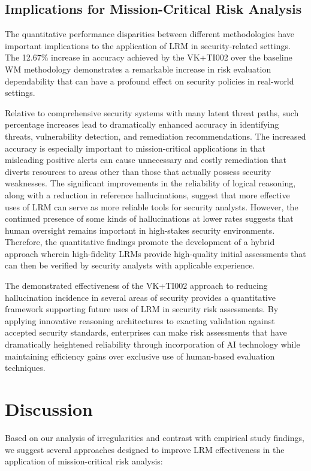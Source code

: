 \documentclass[sigconf]{acmart}
\begin{document}
\subsection{Implications for Mission-Critical Risk Analysis}
The quantitative performance disparities between different methodologies have important implications to the application of LRM in security-related settings. The 12.67\% increase in accuracy achieved by the VK+TI002 over the baseline WM methodology demonstrates a remarkable increase in risk evaluation dependability that can have a profound effect on security policies in real-world settings.

Relative to comprehensive security systems with many latent threat paths, such percentage increases lead to dramatically enhanced accuracy in identifying threats, vulnerability detection, and remediation recommendations. The increased accuracy is especially important to mission-critical applications in that misleading positive alerts can cause unnecessary and costly remediation that diverts resources to areas other than those that actually possess security weaknesses. The significant improvements in the reliability of logical reasoning, along with a reduction in reference hallucinations, suggest that more effective uses of LRM can serve as more reliable tools for security analysts. However, the continued presence of some kinds of hallucinations at lower rates suggests that human oversight remains important in high-stakes security environments. Therefore, the quantitative findings promote the development of a hybrid approach wherein high-fidelity LRMs provide high-quality initial assessments that can then be verified by security analysts with applicable experience.

The demonstrated effectiveness of the VK+TI002 approach to reducing hallucination incidence in several areas of security provides a quantitative framework supporting future uses of LRM in security risk assessments. By applying innovative reasoning architectures to exacting validation against accepted security standards, enterprises can make risk assessments that have dramatically heightened reliability through incorporation of AI technology while maintaining efficiency gains over exclusive use of human-based evaluation techniques.

\section{Discussion}
Based on our analysis of irregularities and contrast with empirical study findings, we suggest several approaches designed to improve LRM effectiveness in the application of mission-critical risk analysis:
\end{document}
